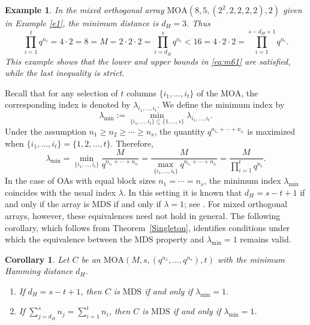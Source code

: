 \documentclass[11pt]{article}
\newtheorem{Corollary}[Theorem]{Corollary}
\newtheorem{Example}[Theorem]{Example}
\newtheorem{Definition and Notation}[Theorem]{Definition and Notation}
\begin{document}
\begin{Example}\label{ma50}
In the mixed orthogonal array $\mathrm{MOA}(8,5,(2^2,2,2,2,2),2)$ given in Example \ref{e1}, the minimum distance is $d_H = 3$. Thus
$$
\prod_{i=1}^{t} q^{n_i} =4\cdot 2 = 8= M=2\cdot 2\cdot 2=  \prod_{i=d_H}^{s} q^{n_i} < 16=4\cdot 2\cdot 2=\prod_{i=1}^{s-d_H+1} q^{n_i}.
$$
This example shows that the lower and upper bounds in \eqref{eq:m61} are satisfied, while the last inequality is strict. 
\end{Example}

Recall that for any selection of $t$ columns $\{i_1,\dots,i_t\}$ of the $\mathrm{MOA}$, the corresponding index is denoted by $\lambda_{i_1,\dots,i_t}$.
We define the minimum index by
$$
\lambda_{\min}:=\min_{\{i_1,\dots,i_t\}\subseteq\{1,\dots,s\}}
\lambda_{i_1,\dots,i_t}.
$$
Under the assumption $n_1 \ge n_2 \ge \cdots \ge n_s$, the quantity $q^{n_{i_1}+\cdots+n_{i_t}}$ is maximized when $\{i_1,\dots,i_t\}=\{1,2,\dots,t\}$. Therefore,
$$
\lambda_{\min}
= \min_{\{i_1,\dots,i_t\}}
\frac{M}{q^{n_{i_1}+\cdots+n_{i_t}}}
= \frac{M}{\max\limits_{\{i_1,\dots,i_t\}} q^{n_{i_1}+\cdots+n_{i_t}}}
= \frac{M}{\prod_{i=1}^{t} q^{n_i}}.
$$
In the case of OAs with equal block sizes $n_1=\cdots=n_s$, the minimum index $\lambda_{\min}$ coincides with the usual index $\lambda$. In this setting it is known that $d_H = s - t + 1$ if and only if the array is MDS if and only if $\lambda = 1$; see \cite[Theorems 4.20 and 4.21]{HSS2012}. For mixed orthogonal arrays, however, these equivalences need not hold in general. The following corollary, which follows from Theorem~\ref{Singleton}, identifies conditions under which the equivalence between the MDS property and $\lambda_{\min}=1$ remains valid.

\begin{Corollary}\label{ma60}
 Let $C$ be an $\mathrm{MOA}(M, s, (q^{n_1},\dots, q^{n_s}), t)$ with the minimum Hamming distance $d_H$.
 \begin{enumerate}
     \item If  $d_H = s - t + 1$, then $C$ is $\mathrm{MDS}$ if and only if $\lambda_{\min}=1$. 
    \item If $\sum_{j=d_H}^{s} n_j= \sum_{i=1}^{t} n_i $, then $C$ is $\mathrm{MDS}$ if and only if $\lambda_{\min}=1$.
  \end{enumerate}
\end{Corollary}
\end{document}
